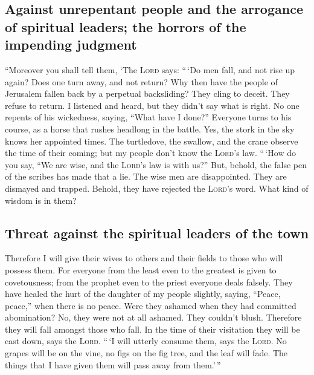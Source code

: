 \hypertarget{against-unrepentant-people-and-the-arrogance-of-spiritual-leaders-the-horrors-of-the-impending-judgment}{%
\subsection{Against unrepentant people and the arrogance of spiritual
leaders; the horrors of the impending
judgment}\label{against-unrepentant-people-and-the-arrogance-of-spiritual-leaders-the-horrors-of-the-impending-judgment}}

 ``Moreover you shall tell them, `The \textsc{Lord} says:
``\,`Do men fall, and not rise up again? Does one turn away, and not
return?  Why then have the people of Jerusalem fallen back
by a perpetual backsliding? They cling to deceit. They refuse to return.
 I listened and heard, but they didn't say what is right.
No one repents of his wickedness, saying, ``What have I done?'' Everyone
turns to his course, as a horse that rushes headlong in the battle.
 Yes, the stork in the sky knows her appointed times. The
turtledove, the swallow, and the crane observe the time of their coming;
but my people don't know the \textsc{Lord}'s law. 
``\,`How do you say, ``We are wise, and the \textsc{Lord}'s law is with
us?'' But, behold, the false pen of the scribes has made that a lie.
 The wise men are disappointed. They are dismayed and
trapped. Behold, they have rejected the \textsc{Lord}'s word. What kind
of wisdom is in them?

\hypertarget{threat-against-the-spiritual-leaders-of-the-town}{%
\subsection{Threat against the spiritual leaders of the
town}\label{threat-against-the-spiritual-leaders-of-the-town}}

 Therefore I will give their wives to others and their
fields to those who will possess them. For everyone from the least even
to the greatest is given to covetousness; from the prophet even to the
priest everyone deals falsely.  They have healed the hurt
of the daughter of my people slightly, saying, ``Peace, peace,'' when
there is no peace.  Were they ashamed when they had
committed abomination? No, they were not at all ashamed. They couldn't
blush. Therefore they will fall amongst those who fall. In the time of
their visitation they will be cast down, says the \textsc{Lord}.
 ``\,`I will utterly consume them, says the
\textsc{Lord}. No grapes will be on the vine, no figs on the fig tree,
and the leaf will fade. The things that I have given them will pass away
from them.'\,''

